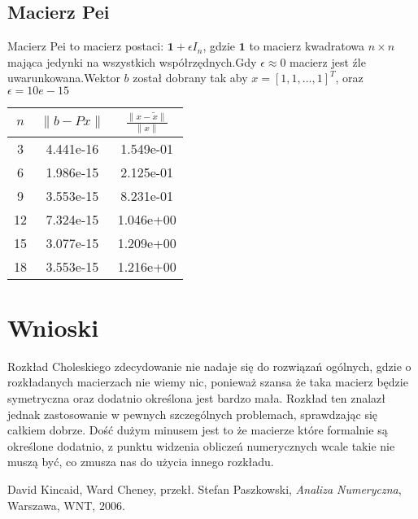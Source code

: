 \documentclass[11pt,wide]{article}
\begin{document}
\subsection{Macierz Pei}
Macierz Pei to macierz postaci: $\textbf{1} + \epsilon I_n$, gdzie $\textbf{1}$ to macierz kwadratowa $n \times n$ mająca jedynki na wszystkich współrzędnych.Gdy $\epsilon \approx 0$ macierz jest źle uwarunkowana.Wektor $b$ został dobrany tak aby $x = [1, 1, ..., 1]^T$, oraz $\epsilon = 10e-15$

\begin{center}
\begin{tabular}{|c|c|c|}
  \hline 
  	$n$ & $\lVert b - Px\rVert$ & $\frac{\lVert x - \tilde{x} \rVert}{\lVert x \rVert}$  \\ \hline
  	3 & 4.441e-16 & 1.549e-01\\ \hline
	6 & 1.986e-15 & 2.125e-01\\ \hline
	9 & 3.553e-15 & 8.231e-01\\ \hline
	12 & 7.324e-15 & 1.046e+00\\ \hline
	15 & 3.077e-15 & 1.209e+00\\ \hline
	18 & 3.553e-15 & 1.216e+00\\ \hline

\end{tabular}
\end{center}

\section{Wnioski}
Rozkład Choleskiego zdecydowanie nie nadaje się do rozwiązań ogólnych, gdzie o rozkładanych macierzach nie wiemy nic, ponieważ szansa że taka macierz będzie symetryczna oraz dodatnio określona jest bardzo mała. Rozkład ten znalazł jednak zastosowanie w pewnych szczególnych problemach, sprawdzając się całkiem dobrze. Dość dużym minusem jest to że macierze które formalnie są określone dodatnio, z punktu widzenia obliczeń numerycznych wcale takie nie muszą być, co zmusza nas do użycia innego rozkładu.
\begin{thebibliography}{10}
  David Kincaid, Ward Cheney,
  przekł. Stefan Paszkowski,
  \emph{Analiza Numeryczna},
  Warszawa, WNT, 2006.
\end{thebibliography}
\end{document}
